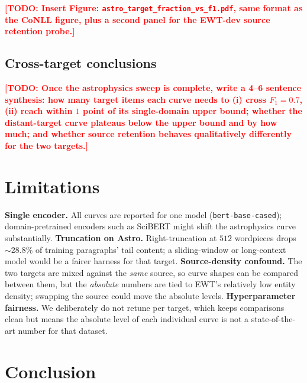 \documentclass[11pt]{article}
\newcommand{\todo}[1]{\textcolor{red}{\textbf{[TODO: #1]}}}
\begin{document}
\todo{Insert Figure: \texttt{astro\_target\_fraction\_vs\_f1.pdf}, same
format as the CoNLL figure, plus a second panel for the EWT-dev source
retention probe.}

\subsection{Cross-target conclusions}
\label{sec:cross-target}

\todo{Once the astrophysics sweep is complete, write a 4--6 sentence
synthesis: how many target items each curve needs to (i) cross $F_1{=}0.7$,
(ii) reach within $1$ point of its single-domain upper bound; whether the
distant-target curve plateaus below the upper bound and by how much; and
whether source retention behaves qualitatively differently for the two
targets.}

\section{Limitations}
\label{sec:limitations}

\textbf{Single encoder.} All curves are reported for one model
(\texttt{bert-base-cased}); domain-pretrained encoders such as SciBERT might
shift the astrophysics curve substantially.
\textbf{Truncation on Astro.} Right-truncation at $512$ wordpieces drops
$\sim$$28.8\%$ of training paragraphs' tail content; a sliding-window or
long-context model would be a fairer harness for that target.
\textbf{Source-density confound.} The two targets are mixed against the
\emph{same} source, so curve shapes can be compared between them, but the
\emph{absolute} numbers are tied to EWT's relatively low entity density;
swapping the source could move the absolute levels.
\textbf{Hyperparameter fairness.} We deliberately do not retune per target,
which keeps comparisons clean but means the absolute level of each
individual curve is not a state-of-the-art number for that dataset.

\section{Conclusion}
\label{sec:conclusion}
\end{document}
